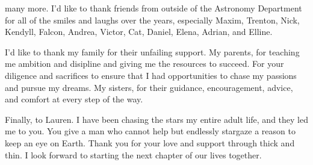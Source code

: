 \documentclass[main.tex]{subfiles}
\begin{document}
\begin{doublespace}
many more.
I'd like to thank friends from outside of the Astronomy Department for all of
the smiles and laughs over the years, especially Maxim, Trenton, Nick, Kendyll,
Falcon, Andrea, Victor, Cat, Daniel, Elena, Adrian, and Elline.
\par
I'd like to thank my family for their unfailing support.
My parents, for teaching me ambition and disipline and giving me the resources
to succeed.
For your diligence and sacrifices to ensure that I had opportunities to chase
my passions and pursue my dreams.
My sisters, for their guidance, encouragement, advice, and comfort at every
step of the way.
\par
Finally, to Lauren.
I have been chasing the stars my entire adult life, and they led me to you.
You give a man who cannot help but endlessly stargaze a reason to keep an
eye on Earth.
Thank you for your love and support through thick and thin.
I look forward to starting the next chapter of our lives together.















\end{doublespace}
\end{document}
